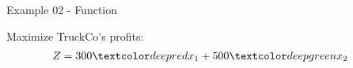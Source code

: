 \begin{frame}{Example 02 - Function}

Maximize TruckCo's profits:
\Huge{
\begin{align*}
    Z &= 300\colora{x_1} + 500\colorb{x_2}
\end{align*}
}

\end{frame}

